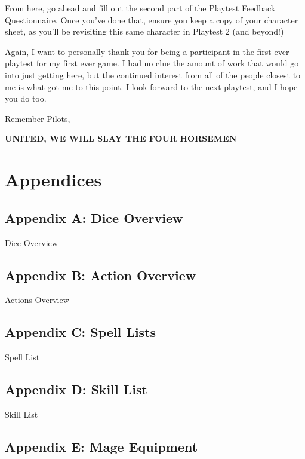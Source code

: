 \documentclass[
]{article}
\begin{document}
From here, go ahead and fill out the second part of the Playtest
Feedback Questionnaire. Once you've done that, ensure you keep a copy of
your character sheet, as you'll be revisiting this same character in
Playtest 2 (and beyond!)

Again, I want to personally thank you for being a participant in the
first ever playtest for my first ever game. I had no clue the amount of
work that would go into just getting here, but the continued interest
from all of the people closest to me is what got me to this point. I
look forward to the next playtest, and I hope you do too.

Remember Pilots,

\textbf{UNITED, WE WILL SLAY THE FOUR HORSEMEN}

\hypertarget{appendices}{%
\section{Appendices}\label{appendices}}

\hypertarget{appendix-a-dice-overview}{%
\subsection{Appendix A: Dice Overview}\label{appendix-a-dice-overview}}

{Dice Overview}

\hypertarget{appendix-b-action-overview}{%
\subsection{Appendix B: Action
Overview}\label{appendix-b-action-overview}}

{Actions Overview}

\hypertarget{appendix-c-spell-lists}{%
\subsection{Appendix C: Spell Lists}\label{appendix-c-spell-lists}}

{Spell List}

\hypertarget{appendix-d-skill-list}{%
\subsection{Appendix D: Skill List}\label{appendix-d-skill-list}}

{Skill List}

\hypertarget{appendix-e-mage-equipment}{%
\subsection{Appendix E: Mage
Equipment}\label{appendix-e-mage-equipment}}
\end{document}
